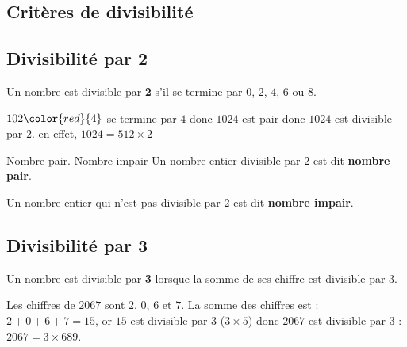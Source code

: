 \begin{pageCours}
\section{Critères de divisibilité}

\subsection{Divisibilité par 2}

\begin{minipage}{0.5\linewidth}
\begin{Pp}
Un nombre est divisible par \textbf{2} s'il se termine par $0$, $2$, $4$, $6$ ou $8$.
\end{Pp}
\end{minipage}
\begin{minipage}{0.5\linewidth}
\begin{Ex}
$102\color{red}{4}$ se termine par $4$ donc $1024$ est pair donc $1024$ est divisible par $2$. en effet, $1024= 512\times2$
 \end{Ex}
\end{minipage}

\begin{DefT}{Nombre pair. Nombre impair}
Un nombre entier divisible par 2 est dit \textbf{nombre pair}.

Un nombre entier qui n'est pas divisible par 2 est dit \textbf{nombre impair}.
\end{DefT}


\subsection{Divisibilité par 3}
 
\begin{minipage}{0.5\linewidth}
\begin{Pp}
Un nombre est divisible par \textbf{3} lorsque la somme de ses chiffre est divisible par 3.
\end{Pp}
\end{minipage}
\begin{minipage}{0.5\linewidth}
\begin{Ex}
Les chiffres de $2067$ sont $2$, $0$, $6$ et $7$. La somme des chiffres est : $2+0+6+7=15$, or $15$ est divisible par $3$ ($3\times5$) donc $2067$ est divisible par $3$ : \(2067=3\times689\).
 \end{Ex}
\end{minipage}


\end{pageCours}
